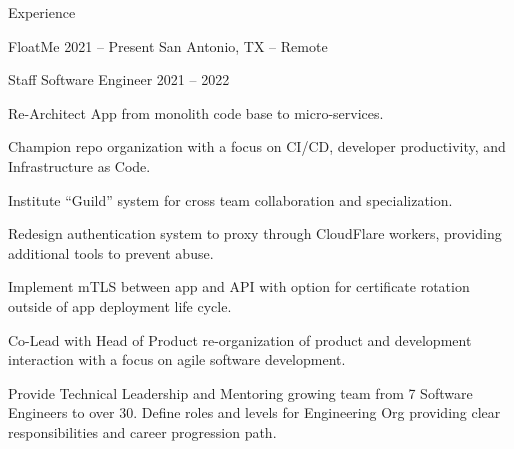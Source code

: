 \documentclass{resume}
\begin{document}
    \begin{rSection}{Experience}

        \begin{rSubsection}{FloatMe}
            {2021 -- Present} %
            {San Antonio, TX -- Remote} %
            \begin{rSubsubsection}{Principal Software Engineer} %
                {2022 -- Present} %
                {\small
            \end{rSubsubsection}
            \begin{rSubsubsection}{Staff Software Engineer} %
                {2021 -- 2022} %
                {\small
            \item Re-Architect App from monolith code base to micro-services.
            \item Champion repo organization with a focus on CI/CD, developer
                productivity, and Infrastructure as Code.
            \item Institute ``Guild'' system for cross team collaboration and
                specialization.
            \item Redesign authentication system to proxy through CloudFlare
                workers, providing additional tools to prevent abuse.
            \item Implement mTLS between app and API with option for
                certificate rotation outside of app deployment life cycle.
            \item Co-Lead with Head of Product re-organization of product
                and development interaction with a focus on agile software
                development.
            \item Provide Technical Leadership and Mentoring growing team from
                7 Software Engineers to over 30. Define roles and levels for
                Engineering Org providing clear responsibilities and career
                progression path.
                }
            \end{rSubsubsection}
        \end{rSubsection}


\end{rSection}
\end{document}
